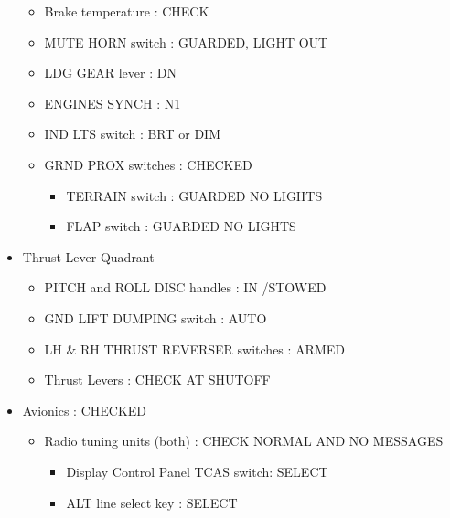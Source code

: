 \begin{itemize}
\begin{itemize}
\item Brake temperature : CHECK

\item MUTE HORN switch : GUARDED, LIGHT OUT

\item LDG GEAR lever : DN

\item ENGINES SYNCH : N1

\item IND LTS switch : BRT or DIM

\item GRND PROX switches : CHECKED

\begin{itemize}
\item TERRAIN switch : GUARDED NO LIGHTS

\item FLAP switch : GUARDED NO LIGHTS

\end{itemize}

\end{itemize}

\item Thrust Lever Quadrant

\begin{itemize}
\item PITCH and ROLL DISC handles : IN \slash  STOWED

\item GND LIFT DUMPING switch : AUTO

\item LH \& RH THRUST REVERSER switches : ARMED

\item Thrust Levers : CHECK AT SHUTOFF

\end{itemize}

\item Avionics : CHECKED

\begin{itemize}
\item Radio tuning units (both) : CHECK NORMAL AND NO MESSAGES

\begin{itemize}
\item Display Control Panel TCAS switch: SELECT

\item ALT line select key : SELECT

\end{itemize}


\end{itemize}
\end{itemize}
